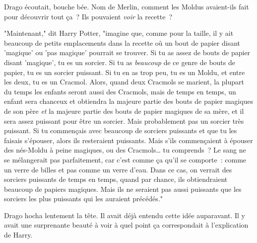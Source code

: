Drago écoutait, bouche bée. Nom de Merlin, comment les Moldus avaient-ils fait pour découvrir tout ça~? Ils pouvaient \emph{voir} la recette~?

"Maintenant," dit Harry Potter, "imagine que, comme pour la taille, il y ait beaucoup de petits emplacements dans la recette où un bout de papier disant 'magique' ou 'pas magique' pourrait se trouver. Si tu as assez de bouts de papier disant 'magique', tu es un sorcier. Si tu as \emph{beaucoup} de ce genre de bouts de papier, tu es un sorcier puissant. Si tu en as trop peu, tu es un Moldu, et entre les deux, tu es un Cracmol. Alors, quand deux Cracmols se marient, la plupart du temps les enfants seront aussi des Cracmols, mais de temps en temps, un enfant sera chanceux et obtiendra la majeure partie des bouts de papier magiques de son père \emph{et} la majeure partie des bouts de papier magiques de sa mère, et il sera assez puissant pour être un sorcier. Mais probablement pas un sorcier très puissant. Si tu commençais avec beaucoup de sorciers puissants et que tu les faisais s'épouser, alors ils resteraient puissants. Mais s'ils commençaient à épouser des nés-Moldu à peine magiques, ou des Cracmols… tu comprends~? Le sang ne se mélangerait pas parfaitement, car c'est comme ça qu'il se comporte~: comme un verre de billes et pas comme un verre d'eau. Dans ce cas, on verrait des sorciers puissants de temps en temps, quand par chance, ils obtiendraient beaucoup de papiers magiques. Mais ils ne seraient pas aussi puissants que les sorciers les plus puissants qui les auraient précédés."

Drago hocha lentement la tête. Il avait déjà entendu cette idée auparavant. Il y avait une surprenante beauté à voir à quel point ça correspondait à l'explication de Harry.


